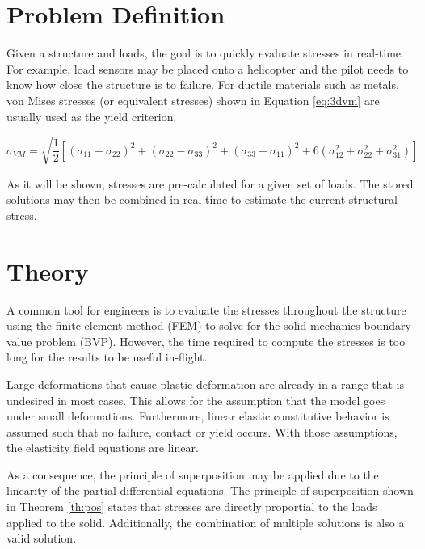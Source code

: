 \documentclass[letterpaper,12pt,]{article}
\begin{document}


\section*{Problem Definition}

Given a structure and loads, the goal is to quickly evaluate stresses in real-time. For example, load sensors may be placed onto a helicopter and the pilot needs to know how close the structure is to failure. For ductile materials such as metals, von Mises stresses (or equivalent stresses) shown in Equation \ref{eq:3dvm} are usually used as the yield criterion.

\begin{equation}
\sigma_{VM} = \sqrt{\frac{1}{2}[
               (\sigma_{11}-\sigma_{22})^{2}
              +(\sigma_{22}-\sigma_{33})^{2}
              +(\sigma_{33}-\sigma_{11})^{2}
              +6(\sigma_{12}^2+\sigma_{22}^2+\sigma_{31}^2)
              ]}
\label{eq:3dvm}
\end{equation}


As it will be shown, stresses are pre-calculated for a given set of loads. The stored solutions may then be combined in real-time to estimate the current structural stress.

\section*{Theory}

A common tool for engineers is to evaluate the stresses throughout the structure using the finite element method (FEM) to solve for the solid mechanics boundary value problem (BVP). However, the time required to compute the stresses is too long for the results to be useful in-flight.

Large deformations that cause plastic deformation are already in a range that is undesired in most cases. This allows for the assumption that the model goes under small deformations. Furthermore, linear elastic constitutive behavior is assumed such that no failure, contact or yield occurs. With those assumptions, the elasticity field equations are linear.

As a consequence, the principle of superposition may be applied due to the linearity of the partial differential equations. The principle of superposition shown in Theorem \ref{th:pos} states that stresses are directly proportial to the loads applied to the solid. Additionally, the combination of multiple solutions is also a valid solution.
\end{document}
